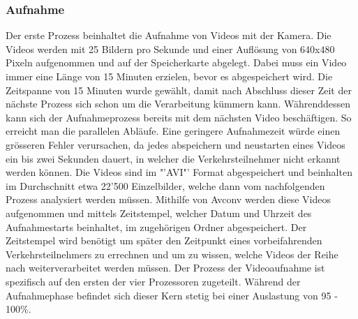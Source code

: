 \subsubsection{Aufnahme}
Der erste Prozess beinhaltet die Aufnahme von Videos mit der Kamera. Die Videos werden mit 25 Bildern pro Sekunde und einer Auflösung von 640x480 Pixeln aufgenommen und auf der Speicherkarte abgelegt. Dabei muss ein Video immer eine Länge von 15 Minuten erzielen, bevor es abgespeichert wird. Die Zeitspanne von 15 Minuten wurde gewählt, damit nach Abschluss dieser Zeit der nächste Prozess sich schon um die Verarbeitung kümmern kann.  Währenddessen kann sich der Aufnahmeprozess bereits mit dem nächsten Video beschäftigen. So erreicht man die parallelen Abläufe. Eine geringere Aufnahmezeit würde einen grösseren Fehler verursachen, da jedes abspeichern und neustarten eines Videos ein bis zwei Sekunden dauert, in welcher die Verkehrsteilnehmer nicht erkannt werden können. Die Videos sind im "'AVI"' Format abgespeichert und beinhalten im Durchschnitt etwa 22'500 Einzelbilder, welche dann vom nachfolgenden Prozess analysiert werden müssen. Mithilfe von Avconv werden diese Videos aufgenommen und mittels Zeitstempel, welcher Datum und Uhrzeit des Aufnahmestarts beinhaltet, im zugehörigen Ordner abgespeichert. Der Zeitstempel wird benötigt um später den Zeitpunkt eines vorbeifahrenden Verkehrsteilnehmers zu errechnen und um zu wissen, welche Videos der Reihe nach weiterverarbeitet werden müssen. Der Prozess der Videoaufnahme ist spezifisch auf den ersten der vier Prozessoren zugeteilt. Während der Aufnahmephase befindet sich dieser Kern stetig bei einer Auslastung von 95 - 100\%.

